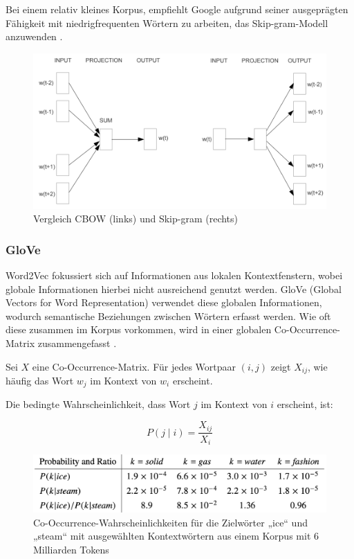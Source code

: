 Bei einem relativ kleines Korpus, empfiehlt Google aufgrund seiner ausgeprägten Fähigkeit mit niedrigfrequenten Wörtern zu arbeiten, 
das Skip-gram-Modell anzuwenden \cite{schumacher2024word2vec}.

\begin{figure}[htbp]
    \begin{center}
        \includegraphics[scale=0.6]{static/cbow_skipgram.png}
        \caption{\label{fig:cbow_skipgram} Vergleich CBOW (links) und Skip-gram (rechts) \cite{mikolov2013}}
    \end{center}
\end{figure}

\subsubsection{GloVe}

Word2Vec fokussiert sich auf Informationen aus lokalen Kontextfenstern, wobei globale Informationen hierbei nicht ausreichend genutzt werden.
GloVe (Global Vectors for Word Representation) verwendet diese globalen Informationen, wodurch semantische Beziehungen zwischen Wörtern erfasst werden.
Wie oft diese zusammen im Korpus vorkommen, wird in einer globalen Co-Occurrence-Matrix zusammengefasst \cite{Wang:2020aa}.

Sei $X$ eine Co-Occurrence-Matrix.
Für jedes Wortpaar $(i, j)$ zeigt $X_{ij}$, wie häufig das Wort $w_j$ im Kontext von $w_i$ erscheint.

Die bedingte Wahrscheinlichkeit, dass Wort $j$ im Kontext von $i$ erscheint, ist:

\begin{equation}
    P(j \mid i) = \frac{X_{ij}}{X_i}
\end{equation}

\begin{figure}[htbp]
    \begin{center}
        \includegraphics[scale=0.3]{static/glove_matrix.png}
        \caption{\label{fig:glove_matrix} Co-Occurrence-Wahrscheinlichkeiten für die Zielwörter „ice“ und „steam“ mit ausgewählten Kontextwörtern aus einem Korpus mit 6 Milliarden Tokens \cite{pennington2014glove}}
    \end{center}
\end{figure}

